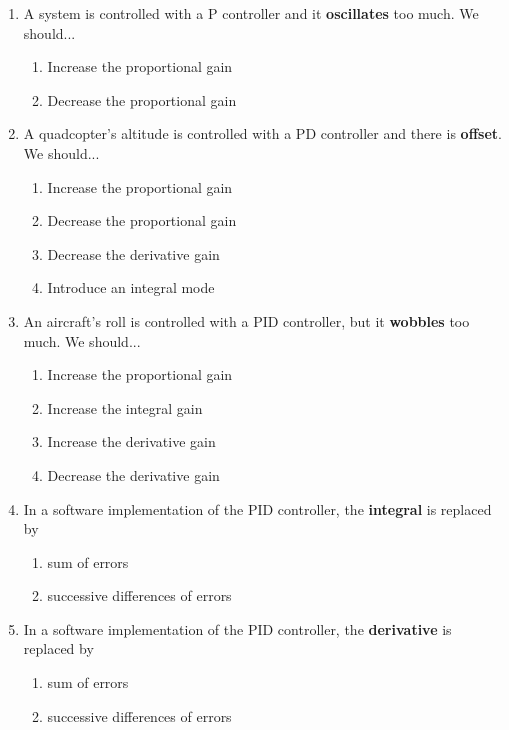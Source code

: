 \documentclass[a4paper,10pt,reqno]{amsart}
\numberwithin{equation}{section}
\theoremstyle{plain}
\begin{document}
\begin{enumerate}
  \item A system is controlled with a P controller and it \textbf{oscillates} too much. 
        We should...
  \begin{enumerate}
   \item Increase the proportional gain
   \item Decrease the proportional gain
  \end{enumerate}
  
  
  \item A quadcopter's altitude is controlled with a PD controller and there
        is \textbf{offset}. We should...        
  \begin{enumerate}
   \item Increase the proportional gain
   \item Decrease the proportional gain
   \item Decrease the derivative gain
   \item Introduce an integral mode
  \end{enumerate}
        
  \item An aircraft's roll is controlled with a PID controller, but it \textbf{wobbles}
        too much. We should...
  \begin{enumerate}
   \item Increase the proportional gain
   \item Increase the integral gain
   \item Increase the derivative gain
   \item Decrease the derivative gain
  \end{enumerate}
  
  


  \item In a software implementation of the PID controller, the \textbf{integral} 
        is replaced by
  \begin{enumerate}
   \item sum of errors
   \item successive differences of errors
  \end{enumerate}
        
  \item In a software implementation of the PID controller, the \textbf{derivative} 
        is replaced by
  \begin{enumerate}
   \item sum of errors
   \item successive differences of errors
  \end{enumerate}      
\end{enumerate}
\end{document}
